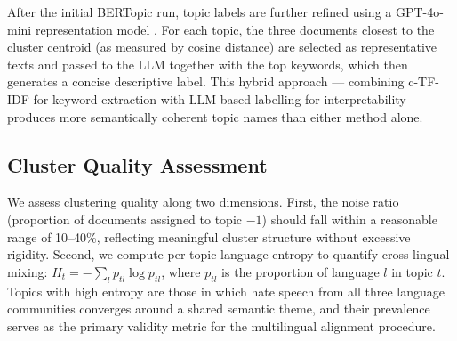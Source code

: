 \documentclass[../CLthesis.tex]{subfiles}
\begin{document}
After the initial BERTopic run, topic labels are further refined using a GPT-4o-mini representation model \citep{openai2024gpt4technicalreport}. For each topic, the three documents closest to the cluster centroid (as measured by cosine distance) are selected as representative texts and passed to the LLM together with the top keywords, which then generates a concise descriptive label. This hybrid approach — combining c-TF-IDF for keyword extraction with LLM-based labelling for interpretability — produces more semantically coherent topic names than either method alone.

\subsection{Cluster Quality Assessment}

We assess clustering quality along two dimensions. First, the noise ratio (proportion of documents assigned to topic $-1$) should fall within a reasonable range of 10--40\%, reflecting meaningful cluster structure without excessive rigidity. Second, we compute per-topic language entropy to quantify cross-lingual mixing: $H_t = -\sum_{l} p_{tl} \log p_{tl}$, where $p_{tl}$ is the proportion of language $l$ in topic $t$. Topics with high entropy are those in which hate speech from all three language communities converges around a shared semantic theme, and their prevalence serves as the primary validity metric for the multilingual alignment procedure.
\end{document}
